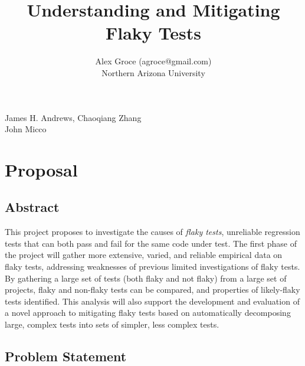 \documentclass[10pt]{article}
\title{Understanding and Mitigating Flaky Tests}
\author{Alex Groce (agroce@gmail.com)\\Northern Arizona University}
\date{}
\begin{document}
\maketitle


 James H. Andrews, Chaoqiang Zhang \\
 John Micco
\section{Proposal}

\subsection{Abstract}

This project proposes to investigate the causes of \emph{flaky tests}, unreliable regression tests that can both pass and fail for the same code under test.  The first phase of the project will gather more extensive, varied, and reliable empirical data on flaky tests, addressing weaknesses of previous limited investigations of flaky tests.  By gathering a large set of tests (both flaky and not flaky) from a large set of projects, flaky and non-flaky tests can be compared, and properties of likely-flaky tests identified.  This analysis will also support the development and evaluation of a novel approach to mitigating flaky tests based on automatically decomposing large, complex tests into sets of simpler, less complex tests.

\subsection{Problem Statement}
\end{document}
